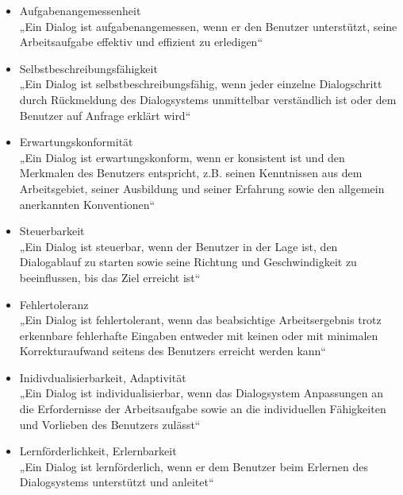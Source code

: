\begin{itemize}
\item Aufgabenangemessenheit\\
„Ein Dialog ist aufgabenangemessen, wenn er den Benutzer unterstützt, seine Arbeitsaufgabe effektiv und effizient zu erledigen“
\item Selbstbeschreibungsfähigkeit\\
„Ein Dialog ist selbstbeschreibungsfähig, wenn jeder einzelne Dialogschritt durch Rückmeldung des Dialogsystems unmittelbar verständlich ist oder dem Benutzer auf Anfrage erklärt wird“
\item Erwartungskonformität\\
„Ein Dialog ist erwartungskonform, wenn er konsistent ist und den Merkmalen des Benutzers entspricht, z.B. seinen Kenntnissen aus dem Arbeitsgebiet, seiner Ausbildung und seiner Erfahrung sowie den allgemein anerkannten Konventionen“
\item Steuerbarkeit\\
„Ein Dialog ist steuerbar, wenn der Benutzer in der Lage ist, den Dialogablauf zu starten sowie seine Richtung und Geschwindigkeit zu beeinflussen, bis das Ziel erreicht ist“
\item Fehlertoleranz\\
„Ein Dialog ist fehlertolerant, wenn das beabsichtige Arbeitsergebnis trotz erkennbare fehlerhafte Eingaben entweder mit keinen oder mit minimalen Korrekturaufwand seitens des Benutzers erreicht werden kann“
\item Inidivdualisierbarkeit, Adaptivität\\
„Ein Dialog ist individualisierbar, wenn das Dialogsystem Anpassungen an die Erfordernisse der Arbeitsaufgabe sowie an die individuellen Fähigkeiten und Vorlieben des Benutzers zulässt“
\item Lernförderlichkeit, Erlernbarkeit\\
„Ein Dialog ist lernförderlich, wenn er dem Benutzer beim Erlernen des Dialogsystems unterstützt und anleitet“
\end{itemize}

